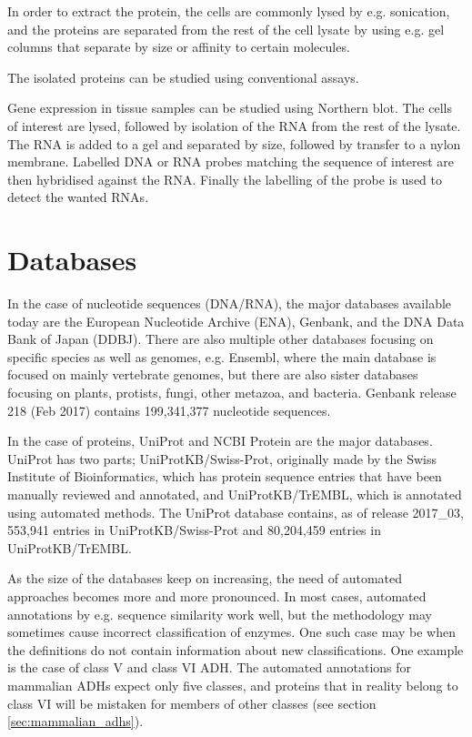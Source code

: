 \documentclass[a4paper, twoside, 12pt, openright]{report}
\begin{document}
In order to extract the protein, the cells are commonly lysed by e.g. sonication, and the proteins are separated from the rest of the cell lysate by using e.g. gel columns that separate by size or affinity to certain molecules.

The isolated proteins can be studied using conventional assays.

Gene expression in tissue samples can be studied using Northern blot\cite{alwine_method_1977}. The cells of interest are lysed, followed by isolation of the RNA from the rest of the lysate. The RNA is added to a gel and separated by size, followed by transfer to a nylon membrane. Labelled DNA or RNA probes matching the sequence of interest are then hybridised against the RNA. Finally the labelling of the probe is used to detect the wanted RNAs.


\section{Databases}
\label{sec:databases}

In the case of nucleotide sequences (DNA/RNA), the major databases available today are the European Nucleotide Archive (ENA)\cite{toribio_european_2017}, Genbank\cite{ncbi_resource_coordinators_database_2016}, and the DNA Data Bank of Japan (DDBJ)\cite{tateno_dna_2002}. There are also multiple other databases focusing on specific species as well as genomes, e.g. Ensembl\cite{aken_ensembl_2017}, where the main database is focused on mainly vertebrate genomes, but there are also sister databases focusing on plants, protists, fungi, other metazoa, and bacteria. Genbank release 218 (Feb 2017) contains 199,341,377 nucleotide sequences.

In the case of proteins, UniProt\cite{the_uniprot_consortium_uniprot:_2015} and NCBI Protein\cite{ncbi_resource_coordinators_database_2016} are the major databases. UniProt has two parts; UniProtKB/Swiss-Prot, originally made by the Swiss Institute of Bioinformatics, which has protein sequence entries that have been manually reviewed and annotated, and UniProtKB/TrEMBL, which is annotated using automated methods. The UniProt database contains, as of release 2017\_03, 553,941 entries in UniProtKB/Swiss-Prot and 80,204,459 entries in UniProtKB/TrEMBL.

As the size of the databases keep on increasing, the need of automated approaches becomes more and more pronounced. In most cases, automated annotations by e.g. sequence similarity work well, but the methodology may sometimes cause incorrect classification of enzymes. One such case may be when the definitions do not contain information about new classifications. One example is the case of class V and class VI ADH. The automated annotations for mammalian ADHs expect only five classes, and proteins that in reality belong to class VI will be mistaken for members of other classes (see section \ref{sec:mammalian_adhs}).
\end{document}
